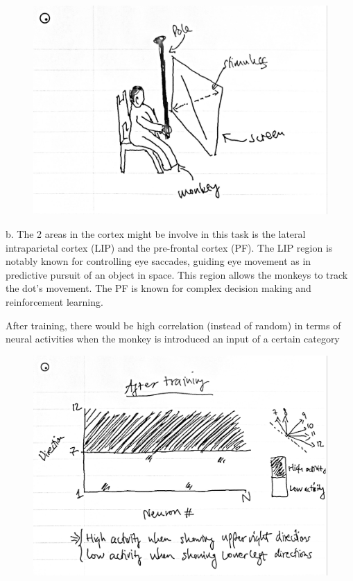 \documentclass[letterpaper, 11pt]{article}
\begin{document}
\begin{figure}[htb!]
	\centering
	\includegraphics[width=0.6\linewidth]{prob3a.jpg}
	\label{fig3a}
\end{figure}

\newpage

b. The 2 areas in the cortex might be involve in this task is the lateral intraparietal cortex (LIP) and the pre-frontal cortex (PF). The LIP region is notably known for controlling eye saccades, guiding eye movement as in predictive pursuit of an object in space. This region allows the monkeys to track the dot's movement. The PF is known for complex decision making and reinforcement learning.

After training, there would be high correlation (instead of random) in terms of neural activities when the monkey is introduced an input of a certain category


\begin{figure}[htb!]
	\centering
	\includegraphics[width=0.8\linewidth]{prob3b.jpg}
	\label{fig3b}
\end{figure}


\end{document}
